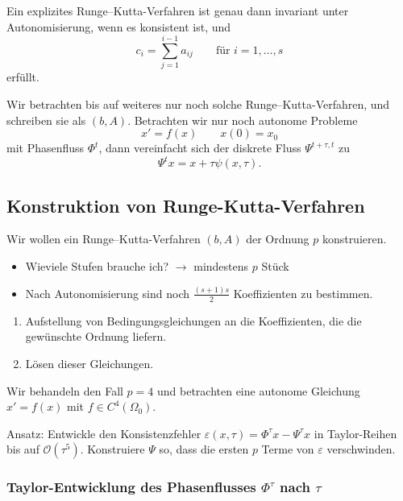 \begin{lemma}
	Ein explizites Runge--Kutta-Verfahren ist genau dann invariant unter Autonomisierung, wenn es konsistent ist, und
	\begin{equation*}
		c_i=\sum_{j=1}^{i-1} a_{ij}
		\qquad
		\text{für $i=1,\dots,s$}
	\end{equation*}
	erfüllt.
\end{lemma}

Wir betrachten bis auf weiteres nur noch solche Runge--Kutta-Verfahren, und schreiben sie als $(b,A)$.
Betrachten wir nur noch autonome Probleme
\begin{equation*}
	x' = f(x)
	\qquad
	x(0) = x_0
\end{equation*}
 mit Phasenfluss $\Phi^t$, dann vereinfacht sich der diskrete Fluss $\Psi^{t+\tau,t}$ zu
\begin{equation*}
	\Psi^t x = x + \tau \psi(x,\tau).
\end{equation*}


\subsection{Konstruktion von Runge-Kutta-Verfahren}

Wir wollen ein Runge--Kutta-Verfahren $(b,A)$ der Ordnung $p$ konstruieren.
\begin{itemize}
	\item Wieviele Stufen brauche ich? $\to$ mindestens $p$ Stück
	\item Nach Autonomisierung sind noch $\frac{(s+1)s}{2}$ Koeffizienten zu bestimmen.
\end{itemize}

\begin{enumerate}[label=Schritt \arabic*, leftmargin=*]
	\item Aufstellung von Bedingungsgleichungen an die Koeffizienten, die die gewünschte Ordnung liefern.
	\item Lösen dieser Gleichungen.
\end{enumerate}

Wir behandeln den Fall $p=4$ und betrachten eine autonome Gleichung $x'=f(x)$ mit $f \in C^4(\Omega_0)$.

Ansatz: Entwickle den Konsistenzfehler $\varepsilon(x,\tau) = \Phi^\tau x - \Psi^\tau x$ in Taylor-Reihen bis auf $\mathcal{O}(\tau^5)$.
Konstruiere $\Psi$ so, dass die ersten $p$ Terme von $\varepsilon$ verschwinden.

\subsubsection{Taylor-Entwicklung des Phasenflusses \texorpdfstring{$\Phi^\tau$}{Phi^tau} nach \texorpdfstring{$\tau$}{tau}}

